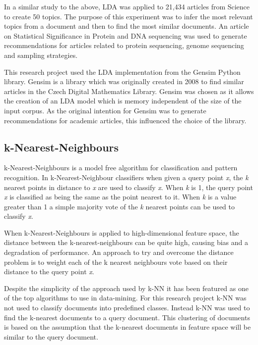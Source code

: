 In a similar study to the above, LDA was applied to 21,434 articles from Science to create 50 topics.
The purpose of this experiment was to infer the most relevant topics from a document and then to find the most similar documents.
An article on Statistical Significance in Protein and DNA sequencing was used to generate recommendations for articles related to protein sequencing, genome sequencing and sampling strategies.

This research project used the LDA implementation from the Gensim Python library.
Gensim is a library which was originally created in 2008 to find similar articles in the Czech Digital Mathematics Library.
Gensim was chosen as it allows the creation of an LDA model which is memory independent of the size of the input corpus.
As the original intention for Gensim was to generate recommendations for academic articles, this influenced the choice of the library.\cite{rehurek_lrec}


\subsection{k-Nearest-Neighbours}
k-Nearest-Neighbours is a model free algorithm for classification and pattern recognition.
In k-Nearest-Neighbour classifiers when given a query point \textit{x}, the \textit{k} nearest points in distance to \textit{x} are used to classify \textit{x}.
When \textit{k} is 1, the query point \textit{x} is classified as being the same as the point nearest to it.
When \textit{k} is a value greater than 1 a simple majority vote of the \textit{k} nearest points can be used to classify \textit{x}.\cite{elementsStat}

When k-Nearest-Neighbours is applied to high-dimensional feature space, the distance between the k-nearest-neighbours can be quite high, causing bias and a degradation of performance.\cite{elementsStat}
An approach to try and overcome the distance problem is to weight each of the k nearest neighbours vote based on their distance to the query point \textit{x}.\cite{top10datamining}

Despite the simplicity of the approach used by k-NN it has been featured as one of the top algorithms to use in data-mining.\cite{top10datamining}
For this research project k-NN was not used to classify documents into predefined classes.
Instead k-NN was used to find the k-nearest documents to a query document.
This clustering of documents is based on the assumption that the k-nearest documents in feature space will be similar to the query document.

